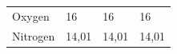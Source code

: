 {\begin{center}
\begin{xtabular*}{\mytablewidth}[t]{|p{10\mystarwidth}|p{10\mystarwidth}|p{10\mystarwidth}|p{10\mystarwidth}|}
    
        Oxygen &
    
    
        16 &
    
    
        16 &
    
    
        16%
     \tabularnewline{}
    
    
        Nitrogen &
    
    
        14,01 &
    
    
        14,01 &
    
    
        14,01%
     \tabularnewline{}
    

\end{xtabular*}
\end{center}}

